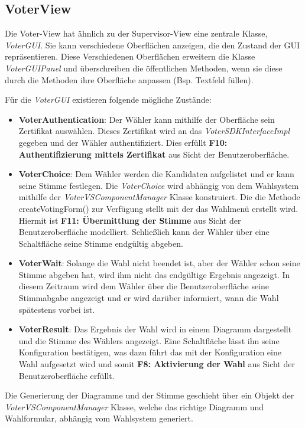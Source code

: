 \documentclass[parskip=full]{scrartcl}
\newcommand{\textitx}[1]{\mbox{\textit{#1}}}
\newcommand{\fakeparagraph}[1]{\textbf{#1}}
\begin{document}
		\subsection{VoterView}
		Die Voter-View hat ähnlich zu der Supervisor-View eine zentrale Klasse, \textitx{VoterGUI}. Sie kann verschiedene Oberflächen anzeigen, die den Zustand der GUI repräsentieren. Diese Verschiedenen Oberflächen erweitern die Klasse \textitx{VoterGUIPanel} und überschreiben die öffentlichen Methoden, wenn sie diese durch die Methoden ihre Oberfläche anpassen (Bsp. Textfeld füllen).
		
		Für die \textitx{VoterGUI} existieren folgende mögliche Zustände:
		\begin{itemize}
			\item\fakeparagraph{VoterAuthentication}: Der Wähler kann mithilfe der Oberfläche sein Zertifikat auswählen. Dieses Zertifikat wird an das \textit{VoterSDKInterfaceImpl} gegeben und der Wähler authentifiziert. Dies erfüllt \textbf{F10: Authentifizierung mittels Zertifikat} aus Sicht der Benutzeroberfläche.
			\item\fakeparagraph{VoterChoice}: Dem Wähler werden die Kandidaten aufgelistet und er kann seine Stimme festlegen. Die \textitx{VoterChoice} wird abhängig von dem Wahlsystem mithilfe der \textit{VoterVSComponentManager} Klasse konstruiert. Die die Methode createVotingForm() zur Verfügung stellt mit der das Wahlmenü erstellt wird. Hiermit ist \textbf{F11: Übermittlung der Stimme} aus Sicht der Benutzeroberfläche modelliert. Schließlich kann der Wähler über eine Schaltfläche seine Stimme endgültig abgeben. 
			\item\fakeparagraph{VoterWait}: Solange die Wahl nicht beendet ist, aber der Wähler schon seine Stimme abgeben hat, wird ihm nicht das endgültige Ergebnis angezeigt. In diesem Zeitraum wird dem Wähler über die Benutzeroberfläche seine Stimmabgabe angezeigt und er wird darüber informiert, wann die Wahl spätestens vorbei ist.
			\item\fakeparagraph{VoterResult}: Das Ergebnis der Wahl wird in einem Diagramm dargestellt und die Stimme des Wählers angezeigt. Eine Schaltfläche lässt ihn seine Konfiguration bestätigen, was dazu führt das mit der Konfiguration eine Wahl aufgesetzt wird und somit \textbf{F8: Aktivierung der Wahl} aus Sicht der Benutzeroberfläche erfüllt.
		\end{itemize}
	
		Die Generierung der Diagramme und der Stimme geschieht über ein Objekt der \textit{VoterVSComponentManager} Klasse, welche das richtige Diagramm und Wahlformular, abhängig vom Wahlsystem generiert.
		
\end{document}
